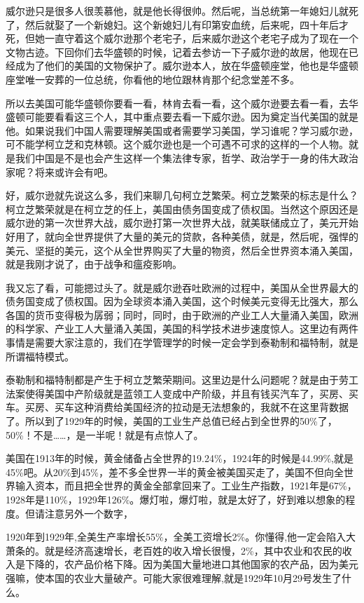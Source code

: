 \documentclass[UTF8, 12pt, a4paper]{ctexrep}
\begin{document}
威尔逊只是很多人很羡慕他，就是他长得很帅。然后呢，当总统第一年媳妇儿就死了，然后就娶了一个新媳妇。这个新媳妇儿有印第安血统，后来呢，四十年后才死，但她一直守着这个威尔逊那个老宅子，后来威尔逊这个老宅子成为了现在一个文物古迹。下回你们去华盛顿的时候，记着去参访一下子威尔逊的故居，他现在已经成为了他们的美国的文物保护了。威尔逊本人，放在华盛顿座堂，他也是华盛顿座堂唯一安葬的一位总统，你看他的地位跟林肯那个纪念堂差不多。

所以去美国可能华盛顿你要看一看，林肯去看一看，这个威尔逊要去看一看，去华盛顿可能要看看这三个人，其中重点要去看一下威尔逊。因为奠定当代美国的就是他。如果说我们中国人需要理解美国或者需要学习美国，学习谁呢？学习威尔逊，可不能学柯立芝和克林顿。这个威尔逊也是一个可遇不可求的这样的一个人物。就是我们中国是不是也会产生这样一个集法律专家，哲学、政治学于一身的伟大政治家呢？将来或许会有吧。

好，威尔逊就先说这么多，我们来聊几句柯立芝繁荣。柯立芝繁荣的标志是什么？柯立芝繁荣就是在柯立芝的任上，美国由债务国变成了债权国。当然这个原因还是威尔逊的第一次世界大战，威尔逊打第一次世界大战，就美联储成立了，美元开始好用了，就向全世界提供了大量的美元的贷款，各种美债，就是，然后呢，强悍的美元、坚挺的美元，这个从全世界购买了大量的物资，然后全世界资本涌入美国，就是我刚才说了，由于战争和瘟疫影响。

我又忘了看，可能摁过头了。就是威尔逊吞吐欧洲的过程中，美国从全世界最大的债务国变成了债权国。因为全球资本涌入美国，这个时候美元变得无比强大，那么各国的货币变得极为孱弱；同时，同时，由于欧洲的产业工人大量涌入美国，欧洲的科学家、产业工人大量涌入美国，美国的科学技术进步速度惊人。这里边有两件事情是需要大家注意的，我们在学管理学的时候一定会学到泰勒制和福特制，就是所谓福特模式。

泰勒制和福特制都是产生于柯立芝繁荣期间。这里边是什么问题呢？就是由于劳工法案使得美国中产阶级就是蓝领工人变成中产阶级，并且有钱买汽车了，买房、买车。买房、买车这种消费给美国经济的拉动是无法想象的，我就不在这里背数据了。所以到了1929年的时候，美国的工业生产总值已经占到全世界的50\%了，50\%！不是……，是一半呢！就是有点惊人了。

美国在1913年的时候，黄金储备占全世界的19.24\%，1924年的时候是44.99\%,就是45\%吧。从20\%到45\%，差不多全世界一半的黄金被美国买走了，美国不但向全世界输入资本，而且把全世界的黄金全部拿回来了。工业生产指数，1921年是67\%，1928年是110\%，1929年126\%。爆灯啦，爆灯啦，就是太好了，好到难以想象的程度。但请注意另外一个数字，

1920年到1929年,全美生产率增长55\%，全美工资增长2\%。你懂得,他一定会陷入大萧条的。就是经济高速增长，老百姓的收入增长很慢，2\%，其中农业和农民的收入是下降的，农产品价格下降。因为美国大量地进口其他国家的农产品，因为美元强嘛，使本国的农业大量破产。可能大家很难理解,就是1929年10月29号发生了什么。
\end{document}
